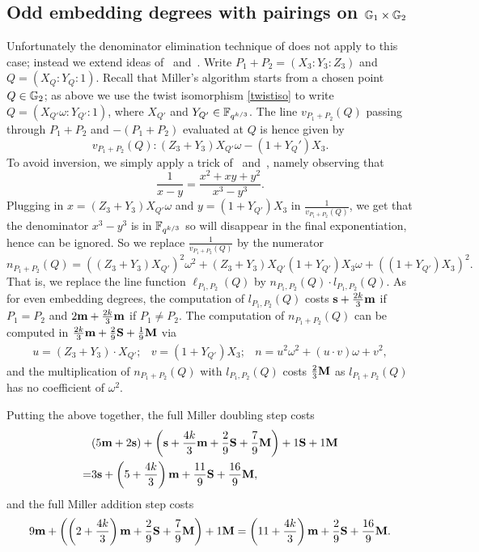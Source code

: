 \subsection{Odd embedding degrees with pairings on $\mathbb{G}_{1} \times \mathbb{G}_{2}$}

Unfortunately the denominator elimination technique of \cite{2010/Gu} does not apply to this case;
instead we extend ideas of~\cite{2008/lin} and~\cite{2009/deg15}.
Write $P_1 + P_2 = (X_3:Y_3:Z_3)$ and $Q = (X_Q:Y_Q:1)$. 
Recall that Miller's algorithm starts from a chosen point $Q \in \mathbb{G}_{2}$;
as above we use the twist isomorphism \eqref{twistiso} to write
$Q = (X_{Q'}\omega:Y_{Q'}:1)$, where $X_{Q'}$ and $Y_{Q'} \in \mathbb{F}_{q^{k/3}}$.
The line $v_{P_1+P_2}(Q)$ passing through $P_1+P_2$ and $-(P_1 + P_2)$ 
evaluated at $Q$
is hence given by
\[v_{P_1+P_2}(Q): 
(Z_3 + Y_3)X_{Q'}\omega - (1+Y_Q')X_3.\]
To avoid inversion, we simply apply a trick of~\cite{2008/lin} and~\cite{2009/deg15}, 
namely observing that
\[\frac{1}{x-y} = \frac{x^2 + xy + y^2}{x^3-y^3}.\]
Plugging in $x = (Z_3 + Y_3)X_{Q'}\omega$ and $y = (1+Y_{Q'})X_3$ in $\frac{1}{v_{P_1+P_2}(Q)}$,
we get that the denominator $x^3 - y^3$ is in $\mathbb{F}_{q^{k/3}}$ so will disappear in the final exponentiation, hence can be ignored.
So we replace $\frac{1}{v_{P_1+P_2}(Q)}$ by the numerator 
$$n_{P_1+P_2}(Q) = ((Z_3 + Y_3)X_{Q'})^2\omega^2 
+ (Z_3 + Y_3)X_{Q'}(1+Y_{Q'})X_3\omega 
+ ((1+Y_{Q'})X_3)^2.$$
That is, we replace the line function $\ell_{P_1,P_2}(Q)$ by $n_{P_1,P_2}(Q) \cdot l_{P_1,P_2}(Q)$.
As for even embedding degrees, the computation of $l_{P_1,P_2}(Q)$ costs $\textbf{s} + \frac{2k}{3}\textbf{m}$ if $P_1 = P_2$ and $2\textbf{m} + \frac{2k}{3}\textbf{m}$ if $P_1 \neq P_2$. 
The computation of $n_{P_1+P_2}(Q)$ can be computed in
$\frac{2k}{3}\textbf{m} + \frac{2}{9}\textbf{S} + \frac{1}{9}\textbf{M}$ via
\[\begin{array}{cccc}
u = (Z_3 + Y_3)\cdot X_{Q'}; &
v = (1+Y_{Q'})X_3; &
n = u^2\omega^2 + (u\cdot v)\omega + v^2,
\end{array}\]
and the multiplication of $n_{P_1+P_2}(Q)$ with $l_{P_1,P_2}(Q)$ costs $\frac{2}{3}\textbf{M}$ 
as $l_{P_1+P_2}(Q)$ has no coefficient of $\omega^2$.

Putting the above together, the full Miller doubling step costs
\begin{align*}
&(5\textbf{m} + 2\textbf{s}) + \left(\textbf{s} + \frac{4k}{3}\textbf{m} + \frac{2}{9}\textbf{S} + \frac{7}{9}\textbf{M}\right)  + 1\textbf{S} + 1\textbf{M} \\
=&3\textbf{s} + \left(5 + \frac{4k}{3}\right)\textbf{m} + \frac{11}{9}\textbf{S} + \frac{16}{9}\textbf{M},
\end{align*}
and the full Miller addition step costs 
\[9\textbf{m} + \left( \left(2+\frac{4k}{3}\right)\textbf{m} + \frac{2}{9}\textbf{S} + \frac{7}{9}\textbf{M}\right) + 1\textbf{M}
=\left( 11+\frac{4k}{3}\right)\textbf{m} + \frac{2}{9}\textbf{S} + \frac{16}{9}\textbf{M}.\]

